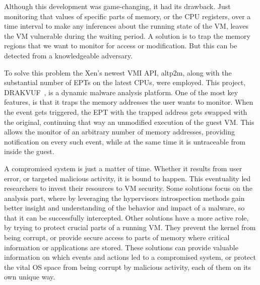 \par Although this development was game-changing, it had its drawback. Just monitoring that values of specific parts of memory, or the \ac{CPU} registers, over a time interval to make any inferences about the running state of the \ac{VM}, leaves the \ac{VM} vulnerable during the waiting period. A solution is to trap the memory regions that we want to monitor for access or modification. But this can be detected from a knowledgeable adversary. 
\par To solve this problem the Xen’s newest \ac{VMI} \ac{API}, altp2m, along with the substantial number of \ac{EPT}s on the latest \ac{CPU}s, were employed. This project, DRAKVUF~\cite{lengyel2014drakvuf}, is a dynamic malware analysis platform. One of the most key features, is that it traps the memory addresses the user wants to monitor. When the event gets triggered, the \ac{EPT} with the trapped address gets swapped with the original, continuing that way an unmodified execution of the guest \ac{VM}. This allows the monitor of an arbitrary number of memory addresses, providing notification on every such event, while at the same time it is untraceable from inside the guest.

\par A compromised system is just a matter of time. Whether it results from user error, or targeted malicious activity, it is bound to happen. This eventuality led researchers to invest their resources to \ac{VM} security. Some solutions focus on the analysis part, where by leveraging the hypervisors introspection methods gain better insight and understanding of the behavior and impact of a malware, so that it can be successfully intercepted. Other solutions have a more active role, by trying to protect crucial parts of a running \ac{VM}. They prevent the kernel from being corrupt, or provide secure access to parts of memory where critical information or applications are stored. 
These solutions can provide valuable information on which events and actions led to a compromised system, or protect the vital \ac{OS} space from being corrupt by malicious activity, each of them on its own unique way. 



